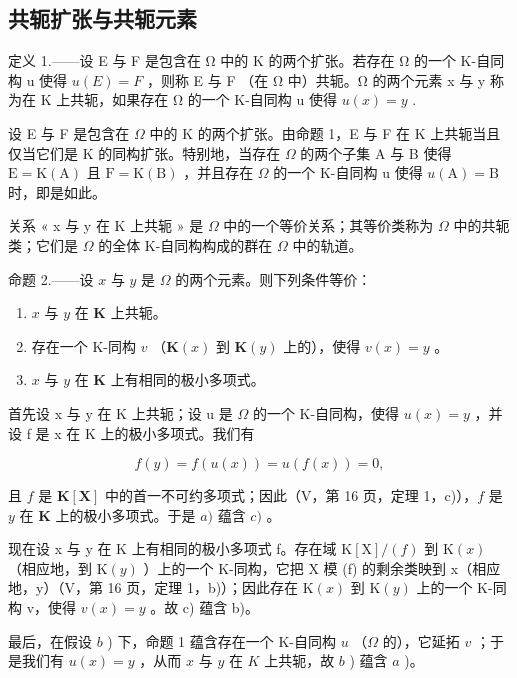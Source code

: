 \subsection{共轭扩张与共轭元素}

定义 1.——设 E 与 F 是包含在 Ω 中的 K 的两个扩张。若存在 Ω 的一个 K-自同构 u 使得 \(u(E) = F\) ，则称 E 与 F （在 Ω 中）共轭。Ω 的两个元素 x 与 y 称为在 K 上共轭，如果存在 Ω 的一个 K-自同构 u 使得 \(u(x) = y\) .

设 E 与 F 是包含在 \(\Omega\) 中的 K 的两个扩张。由命题 1，E 与 F 在 K 上共轭当且仅当它们是 K 的同构扩张。特别地，当存在 \(\Omega\) 的两个子集 A 与 B 使得 \(\mathrm{E} = \mathrm{K}(\mathrm{A})\) 且 \(\mathrm{F} = \mathrm{K}(\mathrm{B})\) ，并且存在 \(\Omega\) 的一个 K-自同构 u 使得 \(u(\mathrm{A}) = \mathrm{B}\) 时，即是如此。

关系 « x 与 y 在 K 上共轭 » 是 \(\Omega\) 中的一个等价关系；其等价类称为 \(\Omega\) 中的共轭类；它们是 \(\Omega\) 的全体 K-自同构构成的群在 \(\Omega\) 中的轨道。

命题 2.——设 \(x\) 与 \(y\) 是 \(\Omega\) 的两个元素。则下列条件等价：

\begin{enumerate}
\def\labelenumi{\alph{enumi})}
\item
  \(x\) 与 \(y\) 在 \(\mathbf{K}\) 上共轭。
\item
  存在一个 K-同构 \(v\) （\(\mathbf{K}(x)\) 到 \(\mathbf{K}(y)\) 上的），使得 \(v(x) = y\) 。
\item
  \(x\) 与 \(y\) 在 \(\mathbf{K}\) 上有相同的极小多项式。
\end{enumerate}

首先设 x 与 y 在 K 上共轭；设 u 是 \(\Omega\) 的一个 K-自同构，使得 \(u(x) = y\) ，并设 f 是 x 在 K 上的极小多项式。我们有

\[
f (y) = f (u (x)) = u (f (x)) = 0,
\]

且 \(f\) 是 \(\mathbf{K}[\mathbf{X}]\) 中的首一不可约多项式；因此（V，第 16 页，定理 1，c)），\(f\) 是 \(y\) 在 \(\mathbf{K}\) 上的极小多项式。于是 \(a)\) 蕴含 \(c)\) 。

现在设 x 与 y 在 K 上有相同的极小多项式 f。存在域 \(\mathrm{K}[\mathrm{X}]/(f)\) 到 \(\mathrm{K}(x)\) （相应地，到 \(\mathrm{K}(y)\) ）上的一个 K-同构，它把 X 模 (f) 的剩余类映到 x（相应地，y）（V，第 16 页，定理 1，b)）；因此存在 \(\mathrm{K}(x)\) 到 \(\mathrm{K}(y)\) 上的一个 K-同构 v，使得 \(v(x)=y\) 。故 c) 蕴含 b)。

最后，在假设 \(b\) ) 下，命题 1 蕴含存在一个 K-自同构 \(u\) （\(\Omega\) 的），它延拓 \(v\) ；于是我们有 \(u(x) = y\) ，从而 \(x\) 与 \(y\) 在 \(K\) 上共轭，故 \(b\) ) 蕴含 \(a\) )。

